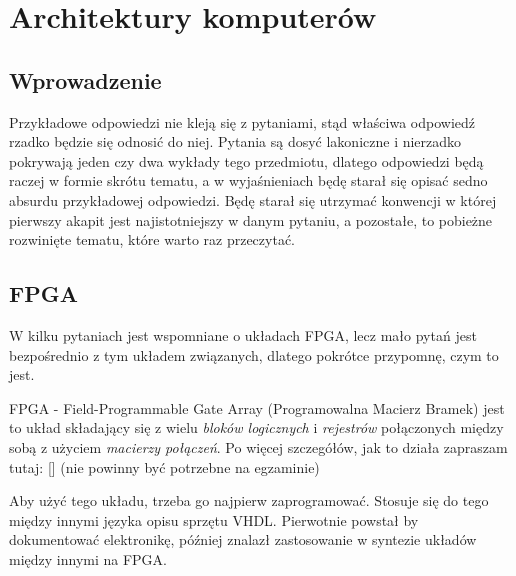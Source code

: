 \chapter{Architektury komputerów}
\PartialToc

\newtheorem{pyt}{Pytanie}
\newtheorem{odp}{Odpowiedź}

\newenvironment{opracowanie}[1][1]{
	\newcounter{nr_pytania}
	\setcounter{nr_pytania}{#1}
}{}
\newcommand{\pytanie}[1]
{
\section{\arabic{nr_pytania}. IT1A\_W08,IT1A\_U8}
\stepcounter{nr_pytania}
\pyt \textbf{#1}
\par
}

\section{Wprowadzenie}

Przykładowe odpowiedzi nie kleją się z pytaniami, stąd właściwa odpowiedź rzadko będzie się odnosić do niej.
Pytania są dosyć lakoniczne i nierzadko pokrywają jeden czy dwa wykłady tego przedmiotu, dlatego odpowiedzi będą raczej w formie skrótu tematu, a w wyjaśnieniach będę starał się opisać sedno absurdu przykładowej odpowiedzi.
Będę starał się utrzymać konwencji w której pierwszy akapit jest najistotniejszy w danym pytaniu, a pozostałe, to pobieżne rozwinięte tematu, które warto raz przeczytać.

\section{FPGA}

W kilku pytaniach jest wspomniane o układach FPGA, lecz mało pytań jest bezpośrednio z tym układem związanych, dlatego pokrótce przypomnę, czym to jest.

FPGA - Field-Programmable Gate Array (Programowalna Macierz Bramek) jest to układ składający się z wielu \emph{bloków logicznych} i \emph{rejestrów} połączonych między sobą z użyciem \emph{macierzy połączeń}. Po więcej szczegółów, jak to działa zapraszam tutaj: [\cite{fpga:hiw}] (nie powinny być potrzebne na egzaminie)

Aby użyć tego układu, trzeba go najpierw zaprogramować. Stosuje się do tego między innymi języka opisu sprzętu VHDL. Pierwotnie powstał by dokumentować elektronikę, później znalazł zastosowanie w syntezie układów między innymi na FPGA.

